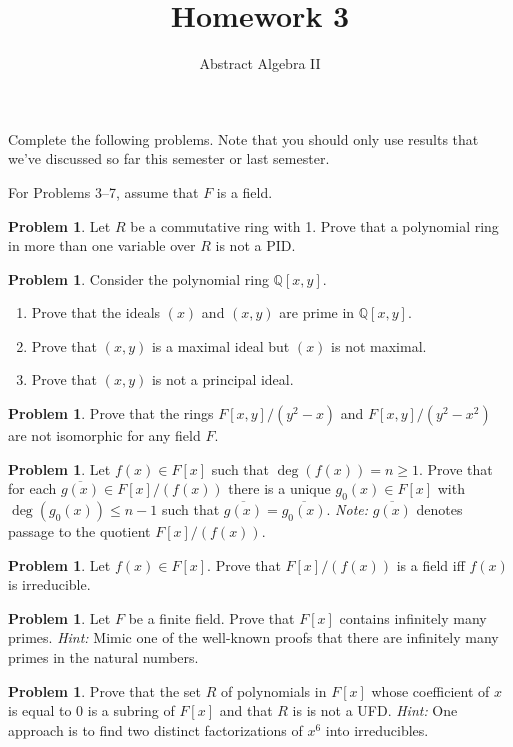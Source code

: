 \documentclass[11pt]{scrartcl}
\theoremstyle{definition}
\newtheorem{problem}[theorem]{Problem}
\newcommand{\blankline}{\pagebreak[2]\vspace{.5\baselineskip}}
\begin{document}
\title{Homework 3}
\subtitle{Abstract Algebra II}
\date{}

\maketitle
\thispagestyle{fancy}

Complete the following problems. Note that you should only use results that we've discussed so far this semester or last semester.

\blankline

For Problems 3--7, assume that $F$ is a field.

\begin{problem}
Let $R$ be a commutative ring with 1.  Prove that a polynomial ring in more than one variable over $R$ is not a PID.
\end{problem}

\begin{problem}
Consider the polynomial ring $\mathbb{Q}[x,y]$.
\begin{enumerate}[label=\rm{(\alph*)}]
\item Prove that the ideals $(x)$ and $(x,y)$ are prime in $\mathbb{Q}[x,y]$.
\item Prove that $(x,y)$ is a maximal ideal but $(x)$ is not maximal.
\item Prove that $(x,y)$ is not a principal ideal.
\end{enumerate}
\end{problem}

\begin{problem}
Prove that the rings $F[x,y]/(y^2-x)$ and $F[x,y]/(y^2-x^2)$ are not isomorphic for any field $F$.
\end{problem}

\begin{problem}
Let $f(x)\in F[x]$ such that $\deg(f(x))=n\geq 1$.  Prove that for each $\overline{g(x)}\in F[x]/(f(x))$ there is a unique $g_0(x)\in F[x]$ with $\deg(g_0(x))\leq n-1$ such that $\overline{g(x)}=\overline{g_0(x)}$. \emph{Note:} $\overline{g(x)}$ denotes passage to the quotient $F[x]/(f(x))$.
\end{problem}

\begin{problem}
Let $f(x)\in F[x]$.  Prove that $F[x]/(f(x))$ is a field iff $f(x)$ is irreducible.
\end{problem}

\begin{problem}
Let $F$ be a finite field.  Prove that $F[x]$ contains infinitely many primes. \emph{Hint:} Mimic one of the well-known proofs that there are infinitely many primes in the natural numbers.  
\end{problem}

\begin{problem}
Prove that the set $R$ of polynomials in $F[x]$ whose coefficient of $x$ is equal to 0 is a subring of $F[x]$ and that $R$ is is not a UFD.  \emph{Hint:} One approach is to find two distinct factorizations of $x^6$ into irreducibles.
\end{problem}
\end{document}
